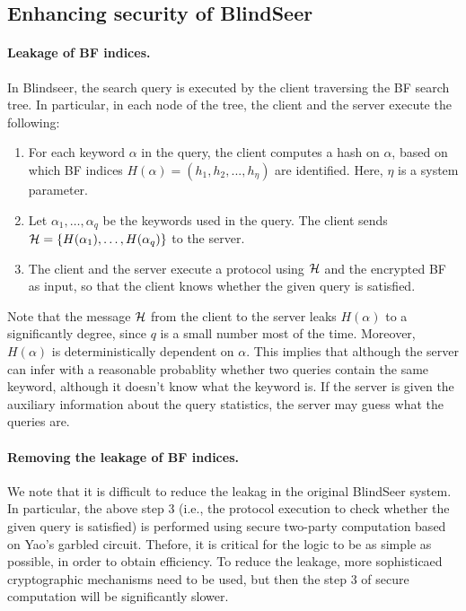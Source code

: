 \def\HHH{{\cal H}}
\subsection{Enhancing security of BlindSeer}

\paragraph{Leakage of BF indices.}
In Blindseer, the search query is executed by the client traversing the BF
search tree. In particular, in each node of the tree, the client and the server
execute the following:

\begin{enumerate}
\item For each keyword $\alpha$ in the query, the client computes a hash on
$\alpha$, based on which BF indices $H(\alpha) =  (h_1, h_2, ..., h_\eta)$
are identified. Here, $\eta$ is a system parameter. 

\item Let $\alpha_1, \ldots, \alpha_q$ be the keywords used in the query.  The
  client sends $\HHH = \{H(\alpha_1), \ldots, H(\alpha_q)\}$ to the server. 

\item The client and the server execute a protocol using $\HHH$ and the
encrypted BF as input, so that the client knows whether the given query is
satisfied. 
\end{enumerate}

Note that the message $\HHH$ from the client to the server leaks $H(\alpha)$ to
a significantly degree, since $q$ is a small number most of the time. Moreover,
$H(\alpha)$ is deterministically dependent on $\alpha$. This implies that
although the server can infer with a reasonable probablity whether two queries
contain the same keyword, although it doesn't know what the keyword is.  If the
server is given the auxiliary information about the query statistics, the
server may guess what the queries are. 

\paragraph{Removing the leakage of BF indices.}

We note that it is difficult to reduce the leakag in the original
BlindSeer system. In particular, the above step 3 (i.e., the protocol execution
to check whether the given query is satisfied) is performed using secure
two-party computation based on Yao's garbled circuit. Thefore, it is critical
for the logic to be as simple as possible, in order to obtain efficiency. To
reduce the leakage, more sophisticaed cryptographic mechanisms need to be used,
but then the step 3 of secure computation will be significantly slower. 

